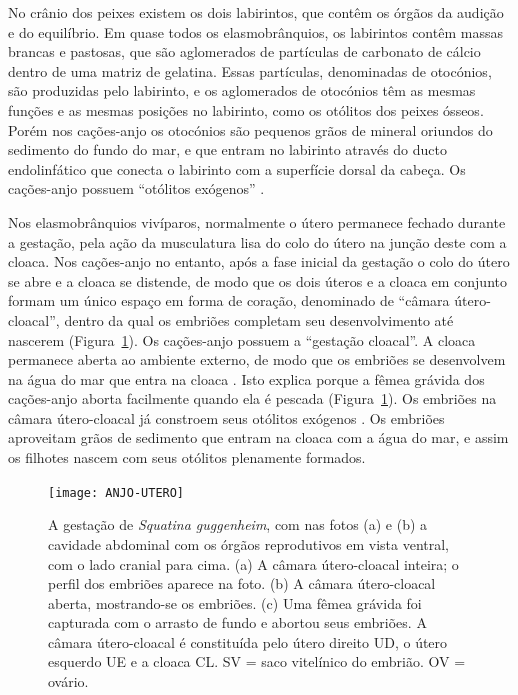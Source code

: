 \documentclass[a4paper,11pt,twoside,showtrims,onecolumn,openright,final]{memoir}
\begin{document}
No crânio dos peixes existem os dois labirintos, que contêm os órgãos da audição e do equilíbrio. 
Em quase todos os elasmobrânquios, os labirintos contêm massas brancas e pastosas, que são 
aglomerados de partículas de carbonato de cálcio dentro de uma matriz de gelatina. 
Essas partículas, denominadas de otocónios, são produzidas pelo labirinto, e os aglomerados 
de otocónios têm as mesmas funções e as mesmas posições no labirinto, como os otólitos 
dos peixes ósseos. Porém nos cações-anjo os otocónios são pequenos grãos de mineral
oriundos do sedimento do fundo do mar, e que entram no labirinto 
através do  ducto endolinfático que conecta o labirinto com a superfície dorsal da cabeça. 
Os cações-anjo possuem ``otólitos exógenos'' \citep{daniel1922}. %

Nos elasmobrânquios vivíparos, normalmente o útero permanece fechado durante a gestação, 
pela ação da musculatura lisa do colo do útero na  junção deste com a cloaca. Nos cações-anjo 
no entanto, após a fase inicial da gestação o colo do útero se abre e a cloaca se distende, 
de modo que os dois úteros e a cloaca em conjunto formam um único espaço em forma de coração, 
denominado de ``câmara útero-cloacal'', dentro da qual os embriões completam seu desenvolvimento 
até nascerem (Figura~\ref{fig:anjos-camara-utero-cloacal}). %
Os cações-anjo possuem a ``gestação cloacal''.  A cloaca permanece aberta ao ambiente externo, 
de modo que os embriões se desenvolvem na água do mar que entra na cloaca \citep{sunye1997}. %
Isto explica porque a fêmea grávida dos cações-anjo aborta facilmente quando ela é pescada (Figura~\ref{fig:anjos-camara-utero-cloacal}). %
Os embriões na câmara útero-cloacal já constroem seus otólitos exógenos \citep{miranda1998}. %
Os embriões aproveitam grãos de sedimento que entram na cloaca com a água do mar, e assim os 
filhotes nascem com seus otólitos plenamente formados. 

%
%

\begin{figure}
\begin{center}
\texttt{[image: ANJO-UTERO]}
\end{center}
\caption[Câmara útero-cloacal de \emph{Squatina guggenheim}]
	{A gestação de \emph{Squatina guggenheim}, com nas fotos (a) e (b) a cavidade abdominal 
	 com os órgãos reprodutivos em vista ventral, com o lado cranial para cima. 
	 (a) A câmara útero-cloacal  inteira; o perfil dos embriões aparece na foto. 
	 (b) A câmara útero-cloacal aberta, mostrando-se os embriões. 
	 (c) Uma fêmea grávida foi capturada com o arrasto de fundo e abortou seus embriões. 
	 A câmara útero-cloacal é constituída pelo útero direito UD, o útero esquerdo UE 
	 e a cloaca CL. SV = saco vitelínico do embrião. OV = ovário.}
\label{fig:anjos-camara-utero-cloacal}
\end{figure}
\end{document}
